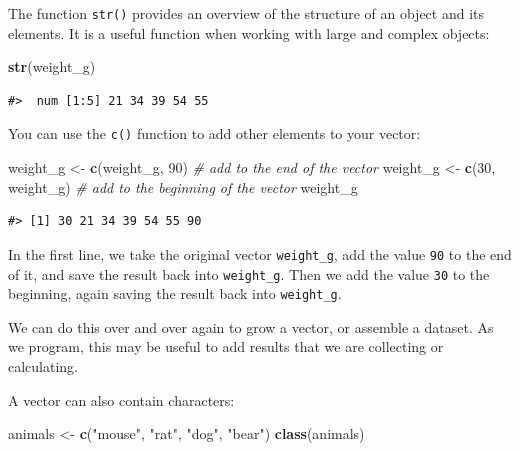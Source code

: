 \documentclass[]{book}
\newenvironment{Shaded}{\begin{snugshade}}{\end{snugshade}}
\newcommand{\KeywordTok}[1]{\textcolor[rgb]{0.13,0.29,0.53}{\textbf{#1}}}
\newcommand{\DecValTok}[1]{\textcolor[rgb]{0.00,0.00,0.81}{#1}}
\newcommand{\StringTok}[1]{\textcolor[rgb]{0.31,0.60,0.02}{#1}}
\newcommand{\CommentTok}[1]{\textcolor[rgb]{0.56,0.35,0.01}{\textit{#1}}}
\newcommand{\NormalTok}[1]{#1}
\begin{document}
The function \texttt{str()} provides an overview of the structure of an
object and its elements. It is a useful function when working with large
and complex objects:

\begin{Shaded}
\begin{Highlighting}[]
\KeywordTok{str}\NormalTok{(weight_g)}
\end{Highlighting}
\end{Shaded}

\begin{verbatim}
#>  num [1:5] 21 34 39 54 55
\end{verbatim}

You can use the \texttt{c()} function to add other elements to your
vector:

\begin{Shaded}
\begin{Highlighting}[]
\NormalTok{weight_g <-}\StringTok{ }\KeywordTok{c}\NormalTok{(weight_g, }\DecValTok{90}\NormalTok{) }\CommentTok{# add to the end of the vector}
\NormalTok{weight_g <-}\StringTok{ }\KeywordTok{c}\NormalTok{(}\DecValTok{30}\NormalTok{, weight_g) }\CommentTok{# add to the beginning of the vector}
\NormalTok{weight_g}
\end{Highlighting}
\end{Shaded}

\begin{verbatim}
#> [1] 30 21 34 39 54 55 90
\end{verbatim}

In the first line, we take the original vector \texttt{weight\_g}, add
the value \texttt{90} to the end of it, and save the result back into
\texttt{weight\_g}. Then we add the value \texttt{30} to the beginning,
again saving the result back into \texttt{weight\_g}.

We can do this over and over again to grow a vector, or assemble a
dataset. As we program, this may be useful to add results that we are
collecting or calculating.

A vector can also contain characters:

\begin{Shaded}
\begin{Highlighting}[]
\NormalTok{animals <-}\StringTok{ }\KeywordTok{c}\NormalTok{(}\StringTok{"mouse"}\NormalTok{, }\StringTok{"rat"}\NormalTok{, }\StringTok{"dog"}\NormalTok{, }\StringTok{"bear"}\NormalTok{)}
\KeywordTok{class}\NormalTok{(animals)}
\end{Highlighting}
\end{Shaded}
\end{document}

